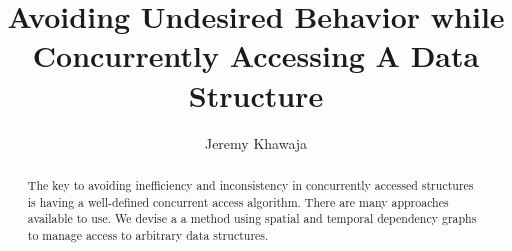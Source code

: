 \documentclass[english]{article}
\begin{document}
	
\hypersetup{
	linktoc=all,     %
	linkcolor=blue,  %
}

\onecolumn
\title{Avoiding Undesired Behavior while Concurrently Accessing A Data Structure}
\author{Jeremy Khawaja}
\maketitle

\begin{abstract}
		The key to avoiding inefficiency and inconsistency in concurrently accessed structures is having a well-defined concurrent access algorithm. There are many approaches available to use. We devise a a method using spatial and temporal dependency graphs to manage access to arbitrary data structures.
\end{abstract}
\twocolumn








\onecolumn
\end{document}
